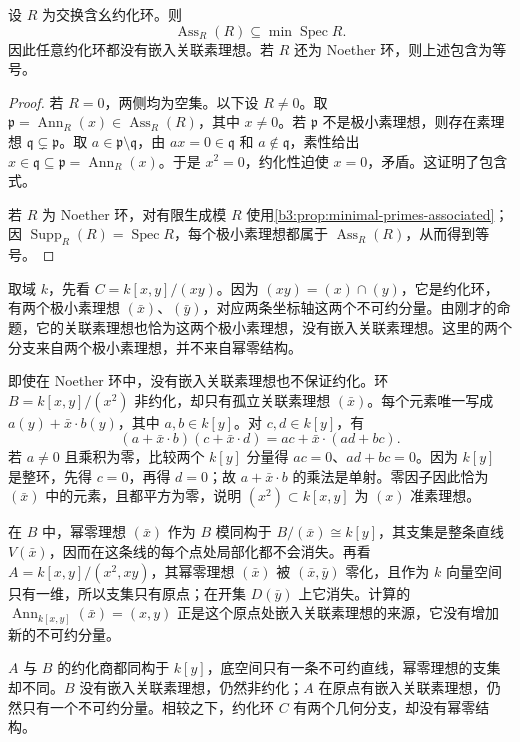 \begin{proposition}\label{b3:prop:reduced-ring-no-embedded-primes}
	设 \(R\) 为交换含幺约化环。则
	\[
		\operatorname{Ass}_R(R)\subseteq\min\operatorname{Spec}R.
	\]
	因此任意约化环都没有嵌入关联素理想。若 \(R\) 还为 Noether 环，则上述包含为等号。
\end{proposition}
\begin{proof}
	若 \(R=0\)，两侧均为空集。以下设 \(R\ne0\)。取 \(\mathfrak p=\operatorname{Ann}_R(x)\in\operatorname{Ass}_R(R)\)，其中 \(x\ne0\)。若 \(\mathfrak p\) 不是极小素理想，则存在素理想 \(\mathfrak q\subsetneq\mathfrak p\)。取 \(a\in\mathfrak p\setminus\mathfrak q\)，由 \(ax=0\in\mathfrak q\) 和 \(a\notin\mathfrak q\)，素性给出 \(x\in\mathfrak q\subseteq\mathfrak p=\operatorname{Ann}_R(x)\)。于是 \(x^2=0\)，约化性迫使 \(x=0\)，矛盾。这证明了包含式。

	若 \(R\) 为 Noether 环，对有限生成模 \(R\) 使用\cref{b3:prop:minimal-primes-associated}；因 \(\operatorname{Supp}_R(R)=\operatorname{Spec}R\)，每个极小素理想都属于 \(\operatorname{Ass}_R(R)\)，从而得到等号。
\end{proof}

取域 \(k\)，先看 \(C=k[x,y]/(xy)\)。因为 \((xy)=(x)\cap(y)\)，它是约化环，有两个极小素理想 \((\bar x)\)、\((\bar y)\)，对应两条坐标轴这两个不可约分量。由刚才的命题，它的关联素理想也恰为这两个极小素理想，没有嵌入关联素理想。这里的两个分支来自两个极小素理想，并不来自幂零结构。

\ProseParagraphBreak
即使在 Noether 环中，没有嵌入关联素理想也不保证约化。环 \(B=k[x,y]/(x^2)\) 非约化，却只有孤立关联素理想 \((\bar x)\)。每个元素唯一写成 \(a(y)+\bar x\cdot b(y)\)，其中 \(a,b\in k[y]\)。对 \(c,d\in k[y]\)，有
\[
	(a+\bar x\cdot b)(c+\bar x\cdot d)=ac+\bar x\cdot(ad+bc).
\]
若 \(a\ne0\) 且乘积为零，比较两个 \(k[y]\) 分量得 \(ac=0\)、\(ad+bc=0\)。因为 \(k[y]\) 是整环，先得 \(c=0\)，再得 \(d=0\)；故 \(a+\bar x\cdot b\) 的乘法是单射。零因子因此恰为 \((\bar x)\) 中的元素，且都平方为零，说明 \((x^2)\subset k[x,y]\) 为 \((x)\) 准素理想。

\ProseParagraphBreak
在 \(B\) 中，幂零理想 \((\bar x)\) 作为 \(B\) 模同构于 \(B/(\bar x)\cong k[y]\)，其支集是整条直线 \(V(\bar x)\)，因而在这条线的每个点处局部化都不会消失。再看 \(A=k[x,y]/(x^2,xy)\)，其幂零理想 \((\bar x)\) 被 \((\bar x,\bar y)\) 零化，且作为 \(k\) 向量空间只有一维，所以支集只有原点；在开集 \(D(\bar y)\) 上它消失。计算的 \(\operatorname{Ann}_{k[x,y]}(\bar x)=(x,y)\) 正是这个原点处嵌入关联素理想的来源，它没有增加新的不可约分量。

\ProseParagraphBreak
\(A\) 与 \(B\) 的约化商都同构于 \(k[y]\)，底空间只有一条不可约直线，幂零理想的支集却不同。\(B\) 没有嵌入关联素理想，仍然非约化；\(A\) 在原点有嵌入关联素理想，仍然只有一个不可约分量。相较之下，约化环 \(C\) 有两个几何分支，却没有幂零结构。
